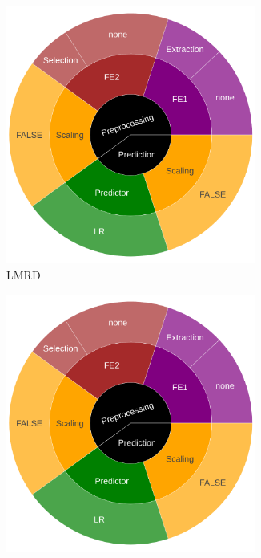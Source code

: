 \begin{figure}
  	\begin{subfigure}[t]{0.3\textwidth}
    \centering\includegraphics[width=0.9\textwidth]{img/sunburst/reuters.png}
    \caption{LMRD}
  	\end{subfigure}
  	\begin{subfigure}[t]{0.3\textwidth}
    \centering\includegraphics[width=0.9\textwidth]{img/sunburst/reuters.png}

\end{subfigure}
\end{figure}
